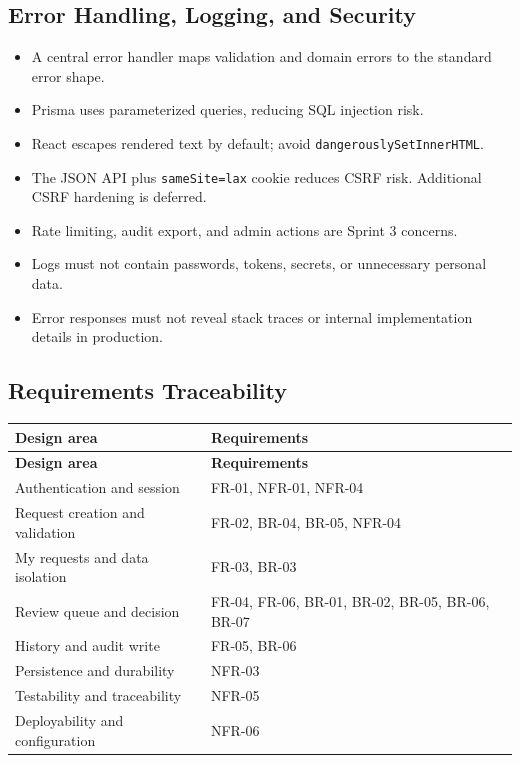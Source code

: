\documentclass[11pt,a4paper]{article}
\begin{document}
\subsection{Error Handling, Logging, and Security}

\begin{itemize}[leftmargin=*,itemsep=2pt,topsep=2pt]
  \item A central error\allowbreak{} handler maps validation and domain errors to the standard error shape.
  \item Prisma uses parameterized queries, reducing SQL injection risk.
  \item React escapes rendered text by default; avoid \texttt{dangerouslySetInnerHTML}.
  \item The JSON API plus \texttt{sameSite=lax} cookie reduces CSRF risk. Additional CSRF hardening is deferred.
  \item Rate limiting, audit export, and admin actions are Sprint 3 concerns.
  \item Logs must not contain passwords, tokens, secrets, or unnecessary personal data.
  \item Error responses must not reveal stack traces or internal implementation details in production.
\end{itemize}

\subsection{Requirements Traceability}

\vspace{0.3em}
\begin{longtable}{|>{\RaggedRight}p{4.5cm}|>{\RaggedRight}p{11.3cm}|}
\hline
\rowcolor{zenPale}\textbf{Design area} & \textbf{Requirements} \\ \hline
\endfirsthead
\hline
\rowcolor{zenPale}\textbf{Design area} & \textbf{Requirements} \\ \hline
\endhead
\hline
\endfoot
Authentication and session & FR-01, NFR-01, NFR-04 \\ \hline
Request creation and validation & FR-02, BR-04, BR-05, NFR-04 \\ \hline
My requests and data isolation & FR-03, BR-03 \\ \hline
Review queue and decision & FR-04, FR-06, BR-01, BR-02, BR-05, BR-06, BR-07 \\ \hline
History and audit write & FR-05, BR-06 \\ \hline
Persistence and durability & NFR-03 \\ \hline
Testability and traceability & NFR-05 \\ \hline
Deployability and configuration & NFR-06 \\ \hline
\end{longtable}
\vspace{0.3em}
\end{document}
